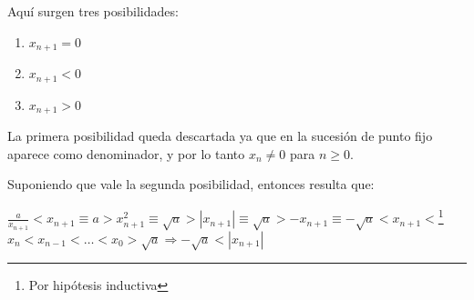 Aqu\'i surgen tres posibilidades: 
\begin{enumerate}
	\item $x_{n+1} = 0$
	\item $x_{n+1} < 0$
	\item $x_{n+1} > 0$
\end{enumerate}

La primera posibilidad queda descartada ya que en la sucesi\'on de punto fijo aparece como denominador, y por lo tanto $x_n \neq 0$ para $n \geq 0$.

Suponiendo que vale la segunda posibilidad, entonces resulta que:

\begin{center}
	$\displaystyle{{\frac{a}{x_{n+1}} < x_{n+1}}} \equiv a > x_{n+1}^2 \equiv \sqrt{a} > |x_{n+1}| \equiv \sqrt{a} > -x_{n+1} \equiv -\sqrt{a} < x_{n+1} <$\footnote{Por hip\'otesis inductiva} $x_n < x_{n-1} < \dots < x_0 > \sqrt{a} \Rightarrow -\sqrt{a} < |x_{n+1}|
	$
\end{center}


